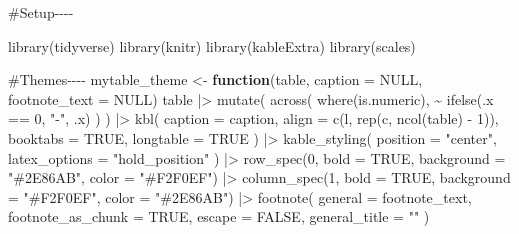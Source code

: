 \documentclass[
  letterpaper,
  DIV=11,
  numbers=noendperiod]{scrartcl}
\newenvironment{Shaded}{\begin{snugshade}}{\end{snugshade}}
\newcommand{\AttributeTok}[1]{\textcolor[rgb]{0.40,0.45,0.13}{#1}}
\newcommand{\CommentTok}[1]{\textcolor[rgb]{0.37,0.37,0.37}{#1}}
\newcommand{\ConstantTok}[1]{\textcolor[rgb]{0.56,0.35,0.01}{#1}}
\newcommand{\ControlFlowTok}[1]{\textcolor[rgb]{0.00,0.23,0.31}{\textbf{#1}}}
\newcommand{\DecValTok}[1]{\textcolor[rgb]{0.68,0.00,0.00}{#1}}
\newcommand{\FunctionTok}[1]{\textcolor[rgb]{0.28,0.35,0.67}{#1}}
\newcommand{\NormalTok}[1]{\textcolor[rgb]{0.00,0.23,0.31}{#1}}
\newcommand{\OtherTok}[1]{\textcolor[rgb]{0.00,0.23,0.31}{#1}}
\newcommand{\SpecialCharTok}[1]{\textcolor[rgb]{0.37,0.37,0.37}{#1}}
\newcommand{\StringTok}[1]{\textcolor[rgb]{0.13,0.47,0.30}{#1}}
\begin{document}
\begin{Shaded}
\begin{Highlighting}[]
\CommentTok{\#Setup{-}{-}{-}{-}}

\FunctionTok{library}\NormalTok{(tidyverse)}
\FunctionTok{library}\NormalTok{(knitr)}
\FunctionTok{library}\NormalTok{(kableExtra)}
\FunctionTok{library}\NormalTok{(scales)}

\CommentTok{\#Themes{-}{-}{-}{-}}
\NormalTok{mytable\_theme }\OtherTok{\textless{}{-}} \ControlFlowTok{function}\NormalTok{(table,}
                          \AttributeTok{caption =} \ConstantTok{NULL}\NormalTok{,}
                          \AttributeTok{footnote\_text =} \ConstantTok{NULL}\NormalTok{)}
\NormalTok{  table }\SpecialCharTok{|\textgreater{}}
   \FunctionTok{mutate}\NormalTok{(}
      \FunctionTok{across}\NormalTok{(}
        \FunctionTok{where}\NormalTok{(is.numeric),}
        \SpecialCharTok{\textasciitilde{}} \FunctionTok{ifelse}\NormalTok{(.x }\SpecialCharTok{==} \DecValTok{0}\NormalTok{, }\StringTok{"{-}"}\NormalTok{, .x)}
\NormalTok{      )}
\NormalTok{    ) }\SpecialCharTok{|\textgreater{}}
    \FunctionTok{kbl}\NormalTok{(}
      \AttributeTok{caption =}\NormalTok{ caption,}
      \AttributeTok{align =} \FunctionTok{c}\NormalTok{(}\StringTok{\textquotesingle{}l\textquotesingle{}}\NormalTok{, }\FunctionTok{rep}\NormalTok{(}\StringTok{\textquotesingle{}c\textquotesingle{}}\NormalTok{, }\FunctionTok{ncol}\NormalTok{(table) }\SpecialCharTok{{-}} \DecValTok{1}\NormalTok{)),}
      \AttributeTok{booktabs =} \ConstantTok{TRUE}\NormalTok{,}
      \AttributeTok{longtable =} \ConstantTok{TRUE}
\NormalTok{    ) }\SpecialCharTok{|\textgreater{}}
    \FunctionTok{kable\_styling}\NormalTok{(}
      \AttributeTok{position =} \StringTok{"center"}\NormalTok{,}
      \AttributeTok{latex\_options =} \StringTok{"hold\_position"}
\NormalTok{    ) }\SpecialCharTok{|\textgreater{}}
    \FunctionTok{row\_spec}\NormalTok{(}\DecValTok{0}\NormalTok{, }\AttributeTok{bold =} \ConstantTok{TRUE}\NormalTok{, }\AttributeTok{background =} \StringTok{"\#2E86AB"}\NormalTok{, }\AttributeTok{color =} \StringTok{"\#F2F0EF"}\NormalTok{) }\SpecialCharTok{|\textgreater{}}
    \FunctionTok{column\_spec}\NormalTok{(}\DecValTok{1}\NormalTok{, }\AttributeTok{bold =} \ConstantTok{TRUE}\NormalTok{, }\AttributeTok{background =} \StringTok{"\#F2F0EF"}\NormalTok{, }\AttributeTok{color =} \StringTok{"\#2E86AB"}\NormalTok{) }\SpecialCharTok{|\textgreater{}}
    \FunctionTok{footnote}\NormalTok{(}
      \AttributeTok{general =}\NormalTok{ footnote\_text,}
      \AttributeTok{footnote\_as\_chunk =} \ConstantTok{TRUE}\NormalTok{,}
      \AttributeTok{escape =} \ConstantTok{FALSE}\NormalTok{,}
      \AttributeTok{general\_title =} \StringTok{""}
\NormalTok{    )}


\end{Highlighting}
\end{Shaded}
\end{document}
